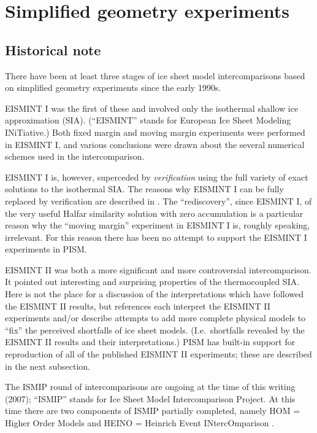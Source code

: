 \documentclass[11pt,final]{amsart}
\begin{document}
\clearpage\newpage
\section{Simplified geometry experiments}\label{sect:simp}

\subsection{Historical note}  There have been at least three stages of ice sheet model intercomparisons based on simplified geometry experiments since the early 1990s.

EISMINT I \cite{EISMINT96} was the first of these and involved only the isothermal shallow ice approximation (SIA).  (``EISMINT'' stands for European Ice Sheet Modeling INiTiative.)  Both fixed margin and moving margin experiments were performed in EISMINT I, and various conclusions were drawn about the several numerical schemes used in the intercomparison.  

EISMINT I is, however, superceded by \emph{verification} using the full variety of exact solutions to the isothermal SIA.  The reasons why EISMINT I can be fully replaced by verification are described in \cite{BLKCB}.  The ``rediscovery'', since EISMINT I, of the very useful Halfar similarity solution with zero accumulation \cite{Halfar83} is a particular reason why the ``moving margin'' experiment in EISMINT I is, roughly speaking, irrelevant.  For this reason there has been no attempt to support the EISMINT I experiments in PISM.

EISMINT II \cite{EISMINT00} was both a more significant and more controversial intercomparison.  It pointed out interesting and surprising properties of the thermocoupled SIA.  Here is not the place for a discussion of the interpretations which have followed the EISMINT II results, but references \cite{BBL,Hindmarsh04,Hindmarsh06,PayneBaldwin,SaitoEISMINT} each interpret the EISMINT II experiments and/or describe attempts to add more complete physical models to ``fix'' the perceived shortfalls of ice sheet models.   (I.e.~shortfalls revealed by the EISMINT II results and their interpretations.)  PISM has built-in support for reproduction of all of the published EISMINT II experiments; these are described in the next subsection.

The ISMIP round of intercomparisons are ongoing at the time of this writing (2007); ``ISMIP'' stands for Ice Sheet Model Intercomparison Project.  At this time there are two components of ISMIP partially completed, namely HOM = Higher Order Models and HEINO = Heinrich Event INtercOmparison \cite{GreveTakahamaCalov}.
\end{document}
